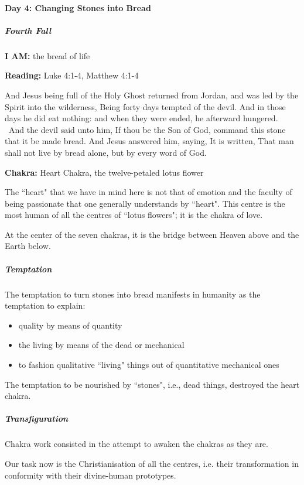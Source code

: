 \paragraph{Day 4: Changing Stones into Bread}

\subparagraph{Fourth Fall}

\textbf{I AM:} the bread of life

\textbf{Reading:} Luke 4:1-4, Matthew 4:1-4


\begin{quotex}
And Jesus being full of the Holy Ghost returned from Jordan, and was led by the Spirit into the wilderness, Being forty days tempted of the devil. And in those days he did eat nothing: and when they were ended, he afterward hungered.  And the devil said unto him, If thou be the Son of God, command this stone that it be made bread. And Jesus answered him, saying, It is written, That man shall not live by bread alone, but by every word of God. 

\end{quotex}

\textbf{Chakra:} Heart Chakra, the twelve-petaled lotus flower


The ``heart" that we have in mind here is not that of emotion and the faculty of being passionate that one generally understands by ``heart". This centre is the most human of all the centres of ``lotus flowers"; it is the chakra of love.

At the center of the seven chakras, it is the bridge between Heaven above and the Earth below.

\subparagraph{Temptation}

The temptation to turn stones into bread manifests in humanity as the temptation to explain:


\begin{itemize}
\item quality by means of quantity 
\item the living by means of the dead or mechanical 
\item to fashion qualitative ``living" things out of quantitative mechanical ones 
\end{itemize}

The temptation to be nourished by ``stones", i.e., dead things, destroyed the heart chakra.


\subparagraph{Transfiguration}

Chakra work consisted in the attempt to awaken the chakras as they are.

Our task now is the Christianisation of all the centres, i.e. their transformation in conformity with their divine-human prototypes.

